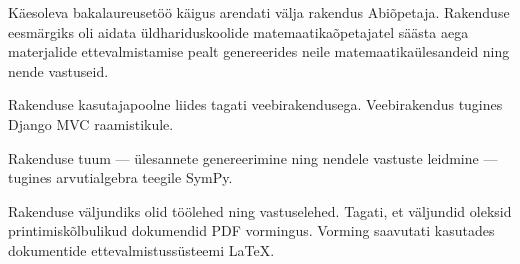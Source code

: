Käesoleva bakalaureusetöö käigus arendati välja rakendus Abiõpetaja. Rakenduse eesmärgiks oli aidata üldhariduskoolide matemaatikaõpetajatel säästa aega materjalide ettevalmistamise pealt genereerides neile matemaatikaülesandeid ning nende vastuseid.

Rakenduse kasutajapoolne liides tagati veebirakendusega. Veebirakendus tugines Django MVC raamistikule.

Rakenduse tuum — ülesannete genereerimine ning nendele vastuste leidmine — tugines arvutialgebra teegile SymPy.

Rakenduse väljundiks olid töölehed ning vastuselehed. Tagati, et väljundid oleksid printimiskõlbulikud dokumendid PDF vormingus. Vorming saavutati kasutades dokumentide ettevalmistussüsteemi LaTeX.

